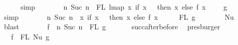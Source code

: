 \begin{isabellebody}
\ \ \ \ \isamarkupfalse%
\ simp\isanewline
\ \ \isamarkupfalse%
\ \isamarkupfalse%
\ {\isachardoublequoteopen}{\isachardot}{\kern0pt}{\isachardot}{\kern0pt}{\isachardot}{\kern0pt}\ {\isacharequal}{\kern0pt}\ {\isacharbraceleft}{\kern0pt}n{\isachardot}{\kern0pt}\ Suc\ n\ {\isasymin}\ FL\ {\isacharparenleft}{\kern0pt}lmap\ {\isacharparenleft}{\kern0pt}{\isasymlambda}x{\isachardot}{\kern0pt}\ if\ x\ {\isacharequal}{\kern0pt}\ {}\ then\ x\ else\ {\isacharparenleft}{\kern0pt}f\ {\isacharparenleft}{\kern0pt}x\ {\isacharminus}{\kern0pt}\ {}{\isacharparenright}{\kern0pt}\ {\isacharplus}{\kern0pt}\ {}{\isacharparenright}{\kern0pt}{\isacharparenright}{\kern0pt}\ g{\isacharparenright}{\kern0pt}{\isacharbraceright}{\kern0pt}{\isachardoublequoteclose}\isanewline
\ \ \ \ \isamarkupfalse%
\ simp\isanewline
\ \ \isamarkupfalse%
\ \isamarkupfalse%
\ {\isachardoublequoteopen}{\isachardot}{\kern0pt}{\isachardot}{\kern0pt}{\isachardot}{\kern0pt}\ {\isacharequal}{\kern0pt}\ {\isacharbraceleft}{\kern0pt}n{\isachardot}{\kern0pt}\ Suc\ n\ {\isasymin}\ {\isacharparenleft}{\kern0pt}{\isasymlambda}x{\isachardot}{\kern0pt}\ if\ x\ {\isacharequal}{\kern0pt}\ {}\ then\ x\ else\ {\isacharparenleft}{\kern0pt}f\ {\isacharparenleft}{\kern0pt}x\ {\isacharminus}{\kern0pt}\ {}{\isacharparenright}{\kern0pt}\ {\isacharplus}{\kern0pt}\ {}{\isacharparenright}{\kern0pt}{\isacharparenright}{\kern0pt}\ {\isacharbackquote}{\kern0pt}\ FL\ g{\isacharbraceright}{\kern0pt}{\isachardoublequoteclose}\isanewline
\ \ \ \ \ \ \isamarkupfalse%
\ Nu\ \isamarkupfalse%
\ blast\isanewline
\ \ \isamarkupfalse%
\ \isamarkupfalse%
\ {\isachardoublequoteopen}{\isachardot}{\kern0pt}{\isachardot}{\kern0pt}{\isachardot}{\kern0pt}\ {\isacharequal}{\kern0pt}\ f\ {\isacharbackquote}{\kern0pt}\ {\isacharbraceleft}{\kern0pt}n{\isachardot}{\kern0pt}\ Suc\ n\ {\isasymin}\ FL\ g{\isacharbraceright}{\kern0pt}{\isachardoublequoteclose}\isanewline
\ \ \ \ \ \isamarkupfalse%
\ succ{\isacharunderscore}{\kern0pt}after{\isacharunderscore}{\kern0pt}before\ \isamarkupfalse%
\ presburger\isanewline
\ \ \isamarkupfalse%
\ \isamarkupfalse%
\ {\isachardoublequoteopen}{\isachardot}{\kern0pt}{\isachardot}{\kern0pt}{\isachardot}{\kern0pt}\ {\isacharequal}{\kern0pt}\ f\ {\isacharbackquote}{\kern0pt}\ FL\ {\isacharparenleft}{\kern0pt}Nu\ g{\isacharparenright}{\kern0pt}{\isachardoublequoteclose}\isanewline

\end{isabellebody}
